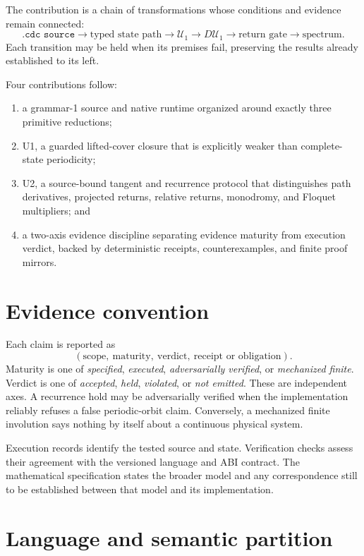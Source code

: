 \documentclass[11pt]{article}
\newcommand{\Uop}{\mathcal{U}}
\begin{document}
The contribution is a chain of transformations whose conditions and evidence
remain connected:
\[
\texttt{.cdc source}
\longrightarrow \text{typed state path}
\longrightarrow \Uop_1
\longrightarrow D\Uop_1
\longrightarrow \text{return gate}
\longrightarrow \text{spectrum}.
\]
Each transition may be held when its premises fail, preserving the results
already established to its left.

Four contributions follow:
\begin{enumerate}
\item a grammar-1 source and native runtime organized around exactly three
  primitive reductions;
\item U1, a guarded lifted-cover closure that is explicitly weaker than
  complete-state periodicity;
\item U2, a source-bound tangent and recurrence protocol that distinguishes path
  derivatives, projected returns, relative returns, monodromy, and Floquet
  multipliers; and
\item a two-axis evidence discipline separating evidence maturity from execution
  verdict, backed by deterministic receipts, counterexamples, and finite proof
  mirrors.
\end{enumerate}

\section{Evidence convention}

Each claim is reported as
\[
(\text{scope},\ \text{maturity},\ \text{verdict},\
 \text{receipt or obligation}).
\]
Maturity is one of \emph{specified}, \emph{executed},
\emph{adversarially verified}, or \emph{mechanized finite}. Verdict is one of
\emph{accepted}, \emph{held}, \emph{violated}, or \emph{not emitted}. These are
independent axes. A recurrence hold may be adversarially verified when the
implementation reliably refuses a false periodic-orbit claim. Conversely, a
mechanized finite involution says nothing by itself about a continuous physical
system.

Execution records identify the tested source and state. Verification checks
assess their agreement with the versioned language and ABI contract. The
mathematical specification states the broader model and any correspondence
still to be established between that model and its implementation.

\section{Language and semantic partition}
\end{document}
